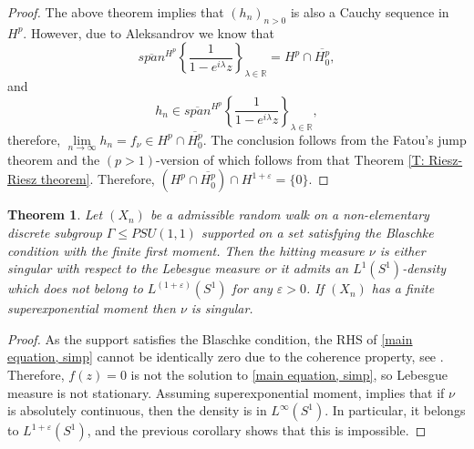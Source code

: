 \documentclass[11pt]{article}
\newtheorem{theorem}{Theorem}[section]
\begin{document}
\begin{proof}
	The above theorem implies that $(h_n)_{n > 0}$ is also a Cauchy sequence in $H^p$. However, due to Aleksandrov we know that
	\[
	\overline{span}^{H^p} \left\lbrace \frac{1}{1 - e^{i\lambda} z} \right\rbrace_{\lambda \in \mathbb{R}} = H^p \cap \overline{H^p_0},
	\]
	and
	\[
	h_n \in \overline{span}^{H^p} \left\lbrace \frac{1}{1 - e^{i\lambda} z} \right\rbrace_{\lambda \in \mathbb{R}},
	\]
	therefore, $\lim\limits_{n \rightarrow \infty} h_n = f_\nu \in H^p \cap \overline{H^p_0}$. The conclusion follows from the Fatou's jump theorem and the $(p > 1)$-version of \cite[Corollary 6.2.12]{cimahardy} which follows from that Theorem \ref{T: Riesz-Riesz theorem}. Therefore, $(H^p \cap \overline{H^p_0}) \cap H^{1 + \varepsilon} = \{0\}$. 
\end{proof}

\begin{theorem}
	Let $(X_n)$ be a admissible random walk on a non-elementary discrete subgroup $\Gamma \leq PSU(1,1)$ supported on a set satisfying the Blaschke condition with the finite first moment. Then the hitting measure $\nu$ is either singular with respect to the Lebesgue measure or it admits an $L^1(S^1)$-density which does not belong to $L^{(1+\varepsilon)}(S^1)$ for any $\varepsilon > 0$. If $(X_n)$ has a finite superexponential moment then $\nu$ is singular.
\end{theorem}
\begin{proof}
	As the support satisfies the Blaschke condition, the RHS of \eqref{main equation, simp} cannot be identically zero due to the coherence property, see \cite[Proposition 4.2.14]{Shapiro1968}. Therefore, $f(z) = 0$ is not the solution to \eqref{main equation, simp}, so Lebesgue measure is not stationary. Assuming superexponential moment, \cite[Theorem 1.5(iii)]{blachere2011harmonic} implies that if $\nu$ is absolutely continuous, then the density is in $L^\infty(S^1)$. In particular, it belongs to $L^{1 + \varepsilon}(S^1)$, and the previous corollary shows that this is impossible.
\end{proof}
\end{document}
